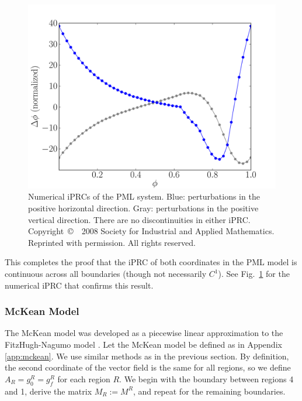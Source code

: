 \documentclass[a4paper,12pt]{article}
\begin{document}
\begin{figure}[h!]
\begin{center} \includegraphics[width=1\textwidth]{pml_prc_fig.pdf}\end{center}
\caption[Numerical iPRCs of the PML system]{Numerical iPRCs of the PML system. Blue: perturbations in the positive horizontal direction. Gray: perturbations in the positive vertical direction.  There are no discontinuities in either iPRC. Copyright~\copyright~~2008 Society for Industrial and Applied Mathematics.  Reprinted with permission.  All rights reserved.}
\label{fig:pml_iprc}\end{figure}

 This completes the proof that the iPRC of both coordinates in the PML model is continuous across all boundaries (though not necessarily $C^1$).  See Fig.~\ref{fig:pml_iprc} for the numerical iPRC that confirms this result.

\subsubsection{McKean Model}
The McKean model was developed as a piecewise linear approximation to the FitzHugh-Nagumo model \cite{McKean1970}.  Let the McKean model be defined as in Appendix \ref{app:mckean}.  We use similar methods as in the previous section.  By definition, the second coordinate of the vector field is the same for all regions, so we define $A_R = g_0^R = g_f^R$ for each region $R$.  We begin with the boundary between regions 4 and 1, derive the matrix $M_R:=M^R$, and repeat for the remaining boundaries.
\end{document}
